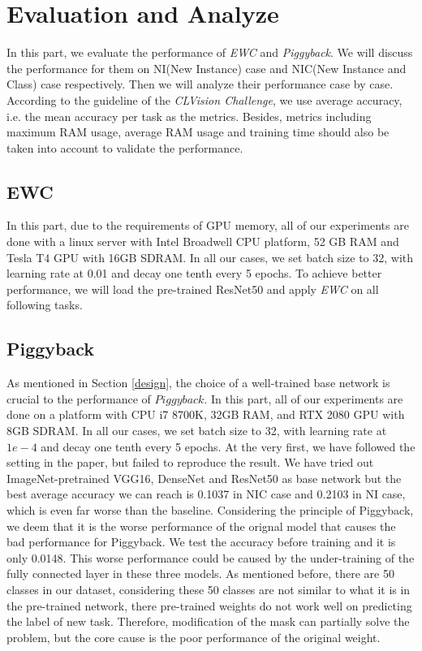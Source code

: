 \section{Evaluation and Analyze}\label{eval}
In this part, we evaluate the performance of \textit{EWC} and \textit{Piggyback}. We will discuss the performance for them on NI(New Instance) case and NIC(New Instance and Class) case respectively. Then we will analyze their performance case by case. According to the guideline of the \textit{CLVision Challenge}, we use average accuracy, i.e. the mean accuracy per task as the metrics. Besides, metrics including maximum RAM usage, average RAM usage and training time should also be taken into account to validate the performance.

\subsection{EWC}
In this part, due to the requirements of GPU memory, all of our experiments are done with a linux server with Intel Broadwell CPU platform, 52 GB RAM and Tesla T4 GPU with 16GB SDRAM. In all our cases, we set batch size to 32, with learning rate at 0.01 and decay one tenth every 5 epochs. To achieve better performance, we will load the pre-trained ResNet50 and apply \textit{EWC} on all following tasks. 

\subsection{Piggyback}
As mentioned in Section \ref{design}, the choice of a well-trained base network is crucial to the performance of $Piggyback$. In this part, all of our experiments are done on a platform with CPU i7 8700K, 32GB RAM, and RTX 2080 GPU with 8GB SDRAM. In all our cases, we set batch size to 32, with learning rate at $1e-4$ and decay one tenth every 5 epochs. At the very first, we have followed the setting in the paper, but failed to reproduce the result. We have tried out ImageNet-pretrained VGG16\cite{simonyan2014very}, DenseNet\cite{huang2017densely} and ResNet50 as base network but the best average accuracy we can reach is 0.1037 in NIC case and 0.2103 in NI case, which is even far worse than the baseline. Considering the principle of Piggyback, we deem that it is the worse performance of the orignal model that causes the bad performance for Piggyback. We test the accuracy before training and it is only 0.0148. This worse performance could be caused by the under-training of the fully connected layer in these three models. As mentioned before, there are 50 classes in our dataset, considering these 50 classes are not similar to what it is in the pre-trained network, there pre-trained weights do not work well on predicting the label of new task. Therefore, modification of the mask can partially solve the problem, but the core cause is the poor performance of the original weight.

